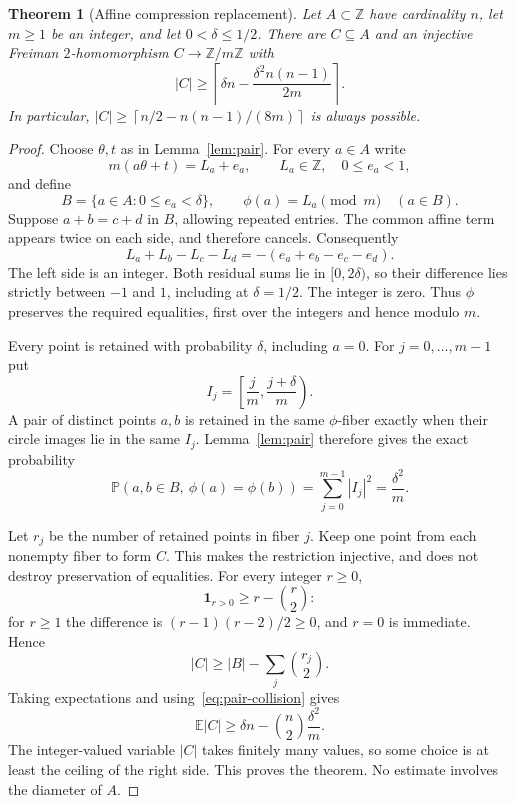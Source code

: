 \documentclass[11pt]{article}
\newtheorem{theorem}{Theorem}[section]
\theoremstyle{definition}
\theoremstyle{remark}
\newcommand{\Z}{\mathbb Z}
\newcommand{\E}{\mathbb E}
\newcommand{\Prob}{\mathbb P}
\newcommand{\ceil}[1]{\left\lceil #1\right\rceil}
\begin{document}
\begin{theorem}[Affine compression replacement]\label{thm:compression}
Let $A\subset\Z$ have cardinality $n$, let $m\ge1$ be an integer, and
let $0<\delta\le1/2$. There are $C\subseteq A$ and an injective Freiman
$2$-homomorphism $C\to\Z/m\Z$ with
\begin{equation}\label{eq:compression}
|C|\ge\ceil{\delta n-\frac{\delta^2 n(n-1)}{2m}}.
\end{equation}
In particular, $|C|\ge\ceil{n/2-n(n-1)/(8m)}$ is always possible.
\end{theorem}
\begin{proof}
Choose $\theta,t$ as in Lemma~\ref{lem:pair}. For every $a\in A$ write
\[
m(a\theta+t)=L_a+e_a,\qquad L_a\in\Z,\quad0\le e_a<1,
\]
and define
\[
B=\{a\in A:0\le e_a<\delta\},\qquad
\phi(a)=L_a\pmod m\quad(a\in B).
\]
Suppose $a+b=c+d$ in $B$, allowing repeated entries. The common affine
term appears twice on each side, and therefore cancels. Consequently
\[
L_a+L_b-L_c-L_d=-(e_a+e_b-e_c-e_d).
\]
The left side is an integer. Both residual sums lie in $[0,2\delta)$,
so their difference lies strictly between $-1$ and $1$, including at
$\delta=1/2$. The integer is zero. Thus $\phi$ preserves the required
equalities, first over the integers and hence modulo $m$.

Every point is retained with probability $\delta$, including $a=0$.
For $j=0,\ldots,m-1$ put
\[
I_j=\left[\frac j m,\frac{j+\delta}{m}\right).
\]
A pair of distinct points $a,b$ is retained in the same $\phi$-fiber
exactly when their circle images lie in the same $I_j$.
Lemma~\ref{lem:pair} therefore gives the exact probability
\begin{equation}\label{eq:pair-collision}
\Prob(a,b\in B,\ \phi(a)=\phi(b))
=\sum_{j=0}^{m-1}|I_j|^2=\frac{\delta^2}{m}.
\end{equation}

Let $r_j$ be the number of retained points in fiber $j$. Keep one point
from each nonempty fiber to form $C$. This makes the restriction
injective, and does not destroy preservation of equalities. For every
integer $r\ge0$,
\[
\mathbf1_{r>0}\ge r-\binom r2:
\]
for $r\ge1$ the difference is $(r-1)(r-2)/2\ge0$, and $r=0$ is
immediate. Hence
\[
|C|\ge |B|-\sum_j\binom{r_j}{2}.
\]
Taking expectations and using~\eqref{eq:pair-collision} gives
\[
\E|C|\ge\delta n-\binom n2\frac{\delta^2}{m}.
\]
The integer-valued variable $|C|$ takes finitely many values, so some
choice is at least the ceiling of the right side. This proves the theorem.
No estimate involves the diameter of $A$.
\end{proof}
\end{document}
